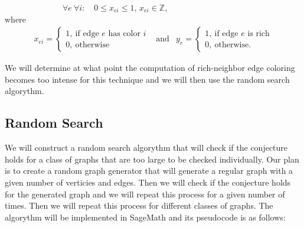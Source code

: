 \documentclass[12pt,a4paper]{amsart}
\theoremstyle{definition} %
\theoremstyle{plain} %
\newcommand{\Z}{\mathbb Z}
\begin{document}
\ \ \ \ \ \ \ \ \ \ \ \ \ \ $\forall e \ \forall i: \quad 0 \leq x_{ei} \leq 1$, $x_{ei} \in \Z$,\\

where
\begin{align*}        x_{ei} = \begin{cases}
            1, \  \text{if edge $e$ has color $i$} \\
            0, \  \text{otherwise}
    \end{cases} & \text{and} & 
    y_{e} = \begin{cases}
        1, \  \text{if edge $e$ is rich} \\
        0, \  \text{otherwise.}
    \end{cases}
\end{align*}

 We will determine at what point the computation of rich-neighbor edge coloring becomes too intense for this technique and we will then use the random search algorythm.

\subsection{Random Search}

We will construct a random search algorythm that will check if the conjecture holds for a class of graphs that are too large to be checked individually. Our plan is to create a random graph generator that will generate a regular graph with a given number of verticies and edges. Then we will check if the conjecture holds for the generated graph and we will repeat this process for a given number of times. Then we will repeat this process for different classes of graphs. The algorythm will be implemented in SageMath and its pseudocode is as follows:
\end{document}
